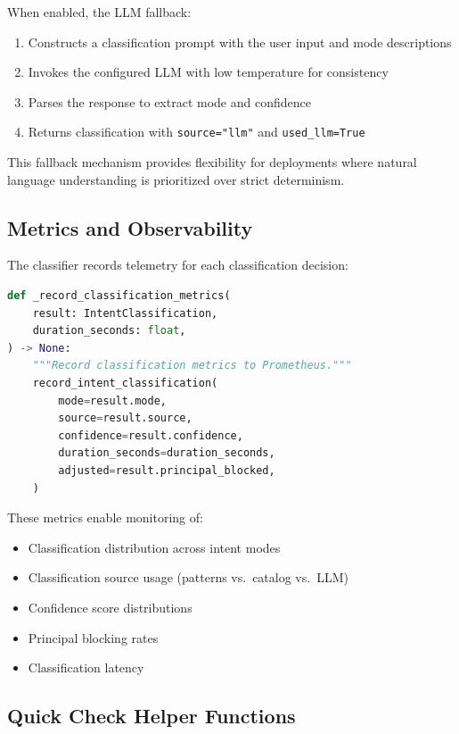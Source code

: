 When enabled, the LLM fallback:
\begin{enumerate}
    \item Constructs a classification prompt with the user input and mode descriptions
    \item Invokes the configured LLM with low temperature for consistency
    \item Parses the response to extract mode and confidence
    \item Returns classification with \texttt{source="llm"} and \texttt{used\_llm=True}
\end{enumerate}

This fallback mechanism provides flexibility for deployments where natural language understanding is prioritized over strict determinism.

\subsection{Metrics and Observability}

The classifier records telemetry for each classification decision:

\begin{lstlisting}[language=Python, caption={Classification metrics recording}, label=lst:classification-metrics]
def _record_classification_metrics(
    result: IntentClassification,
    duration_seconds: float,
) -> None:
    """Record classification metrics to Prometheus."""
    record_intent_classification(
        mode=result.mode,
        source=result.source,
        confidence=result.confidence,
        duration_seconds=duration_seconds,
        adjusted=result.principal_blocked,
    )
\end{lstlisting}

These metrics enable monitoring of:
\begin{itemize}
    \item Classification distribution across intent modes
    \item Classification source usage (patterns vs.\ catalog vs.\ LLM)
    \item Confidence score distributions
    \item Principal blocking rates
    \item Classification latency
\end{itemize}

\subsection{Quick Check Helper Functions}

